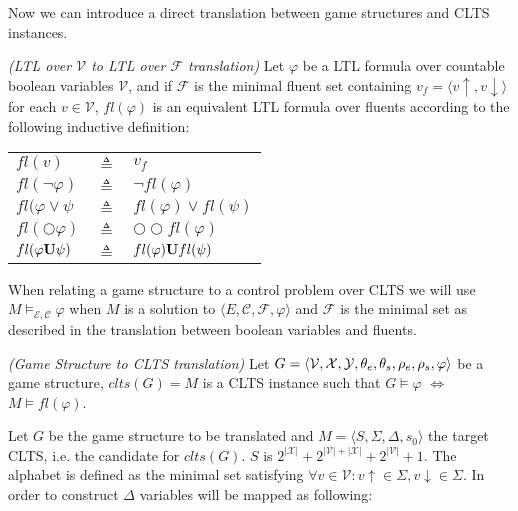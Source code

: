
Now we can introduce a direct translation between game structures and CLTS instances.

\begin{definition}
	\label{def:fl_ltl} \emph{(LTL over $\mathcal{V}$ to LTL over $\mathcal{F}$ translation)} 
	Let $\varphi$ be a LTL formula over countable boolean variables $\mathcal{V}$, and if $\mathcal{F}$ is the minimal fluent set containing $v_f = \langle v\uparrow, v\downarrow \rangle$ for each $v \in \mathcal{V}$, $fl(\varphi)$ is an equivalent LTL formula over fluents according to the following inductive definition:\\
	
\begin{tabular}{ l c l }
	$fl(v)$ & $\triangleq$ & $v_f$\\	
	$fl(\neg \varphi)$ & $\triangleq$ & $\neg fl(\varphi)$\\
	$fl(\varphi \vee \psi$ & $\triangleq$ & $fl(\varphi) \vee fl(\psi)$\\
	$fl(\bigcirc \varphi)$ & $\triangleq$ & $\bigcirc\bigcirc fl(\varphi)$\\
	$fl(\varphi {\bf U} \psi)$ & $\triangleq$ & $fl(\varphi) {\bf U} fl(\psi)$\\
\end{tabular}	
\end{definition}

When relating a game structure to a control problem over CLTS we will use $M \models_{\mathcal{E,C}}\varphi$ when $M$ is a solution to $\langle E, \mathcal{C}, \mathcal{F}, \varphi \rangle$ and $\mathcal{F}$ is the minimal set as described in the translation between boolean variables and fluents.

\begin{definition}
	\label{def:gs_to_clts_translation} \emph{(Game Structure to CLTS translation)} 
Let $G =  \langle {\mathcal{V}}, {\mathcal{X}}, {\mathcal{Y}}, {\theta_e}, {\theta_s}, {\rho_e}, {\rho_s}, \varphi \rangle$ be a game structure, $clts(G)=M$ is a CLTS instance such that $G \models \varphi$ $\iff$ $M \models fl(\varphi)$.
\end{definition}

Let $G$ be the game structure to be translated and $M=\langle S, \Sigma, \Delta, s_0 \rangle$ the target CLTS, i.e. the candidate for $clts(G)$. 
$S$ is $2^{|\mathcal{X}|}+2^{|\mathcal{V}|+|\mathcal{X}|}+2^{|\mathcal{V}|}+1$.
The alphabet is defined as the minimal set satisfying 
$\forall v \in \mathcal{V}: v\uparrow \in \Sigma, v\downarrow \in \Sigma$. 
In order to construct $\Delta$ variables will be mapped as following:

